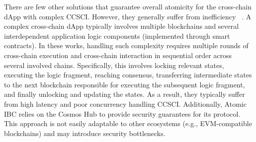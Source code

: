 There are few other solutions that guarantee overall atomicity for the cross-chain dApp with complex CCSCI. 
However, they generally suffer from inefficiency ~\cite{robinson2021general,atomic-ibc,chen2024atomci}. 
A complex cross-chain dApp typically involves multiple blockchains and several interdependent application logic components (implemented through smart contracts).
In these works, handling such complexity requires multiple rounds of cross-chain execution and cross-chain interaction in sequential order across several involved chains. 
Specifically, this involves locking relevant states, executing the logic fragment, reaching consensus, transferring intermediate states to the next blockchain responsible for executing the subsequent logic fragment, and finally unlocking and updating the states. 
As a result, they typically suffer from high latency and poor concurrency handling CCSCI.
Additionally, Atomic IBC \cite{atomic-ibc} relies on the Cosmos Hub to provide security guarantees for its protocol. 
This approach is not easily adaptable to other ecosystems (e.g., EVM-compatible blockchains) and may introduce security bottlenecks.

